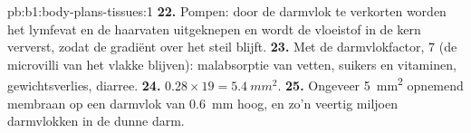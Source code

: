 \begin{solution}{pb:b1:body-plans-tissues:1}
\textbf{22.} Pompen: door de darmvlok te verkorten worden het lymfevat en de
haarvaten uitgeknepen en wordt de vloeistof in de kern ververst, zodat de
gradiënt over het  steil blijft.
\textbf{23.} Met de darmvlokfactor, $7$ (de microvilli van het vlakke 
blijven): malabsorptie van vetten, suikers en vitaminen, gewichtsverlies,
diarree.
\textbf{24.} $0.28\times 19 = \qty{5.4}{mm^2}$.
\textbf{25.} Ongeveer \qty{5}{mm^2} opnemend membraan op een darmvlok van
\qty{0.6}{mm} hoog, en zo'n veertig miljoen darmvlokken in de dunne darm.
\end{solution}
